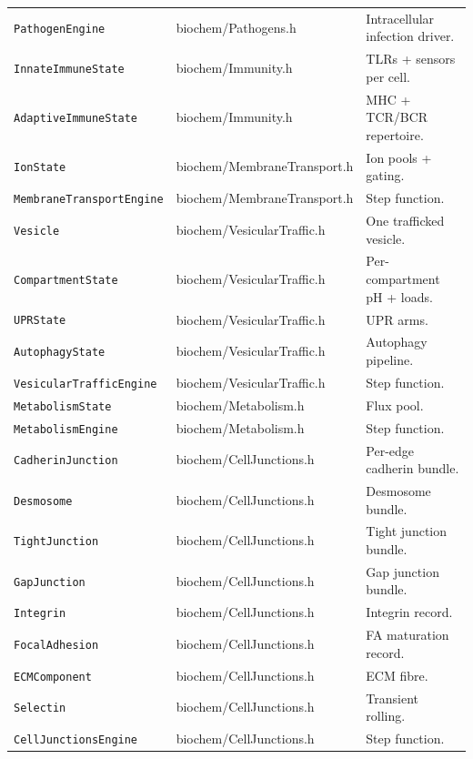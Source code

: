 \documentclass[11pt,letterpaper,twoside,openany]{book}
\newcommand{\code}[1]{\texttt{#1}}
\begin{document}
\begin{longtable}{p{4.4cm}p{3.0cm}p{7.0cm}}
\code{PathogenEngine}     & biochem/Pathogens.h                 & Intracellular infection driver.\\
\code{InnateImmuneState}  & biochem/Immunity.h                  & TLRs + sensors per cell.\\
\code{AdaptiveImmuneState}& biochem/Immunity.h                  & MHC + TCR/BCR repertoire.\\
\code{IonState}           & biochem/MembraneTransport.h         & Ion pools + gating.\\
\code{MembraneTransportEngine}&biochem/MembraneTransport.h      & Step function.\\
\code{Vesicle}            & biochem/VesicularTraffic.h          & One trafficked vesicle.\\
\code{CompartmentState}   & biochem/VesicularTraffic.h          & Per-compartment pH + loads.\\
\code{UPRState}           & biochem/VesicularTraffic.h          & UPR arms.\\
\code{AutophagyState}     & biochem/VesicularTraffic.h          & Autophagy pipeline.\\
\code{VesicularTrafficEngine}& biochem/VesicularTraffic.h       & Step function.\\
\code{MetabolismState}    & biochem/Metabolism.h                & Flux pool.\\
\code{MetabolismEngine}   & biochem/Metabolism.h                & Step function.\\
\code{CadherinJunction}   & biochem/CellJunctions.h             & Per-edge cadherin bundle.\\
\code{Desmosome}          & biochem/CellJunctions.h             & Desmosome bundle.\\
\code{TightJunction}      & biochem/CellJunctions.h             & Tight junction bundle.\\
\code{GapJunction}        & biochem/CellJunctions.h             & Gap junction bundle.\\
\code{Integrin}           & biochem/CellJunctions.h             & Integrin record.\\
\code{FocalAdhesion}      & biochem/CellJunctions.h             & FA maturation record.\\
\code{ECMComponent}       & biochem/CellJunctions.h             & ECM fibre.\\
\code{Selectin}           & biochem/CellJunctions.h             & Transient rolling.\\
\code{CellJunctionsEngine}& biochem/CellJunctions.h             & Step function.\\

\end{longtable}
\end{document}
